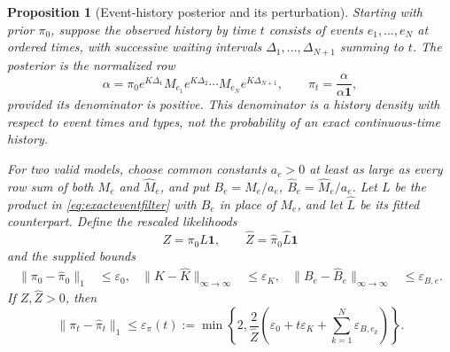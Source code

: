 \documentclass[11pt]{article}
\theoremstyle{plain}
\newtheorem{proposition}[theorem]{Proposition}
\theoremstyle{definition}
\theoremstyle{remark}
\newcommand{\norm}[1]{\lVert#1\rVert}
\begin{document}
\begin{proposition}[Event-history posterior and its perturbation]
\label{prop:eventfilter}
Starting with prior \(\pi_0\), suppose the observed history by time
\(t\) consists of events \(e_1,\ldots,e_N\) at ordered times, with
successive waiting intervals \(\Delta_1,\ldots,\Delta_{N+1}\) summing
to \(t\). The posterior is the normalized row
\begin{equation}\label{eq:exacteventfilter}
 \alpha=\pi_0e^{K\Delta_1}M_{e_1}e^{K\Delta_2}
                 \cdots M_{e_N}e^{K\Delta_{N+1}},\qquad
 \pi_t=\frac{\alpha}{\alpha\mathbf1},
\end{equation}
provided its denominator is positive. This denominator is a history
density with respect to event times and types, not the probability of
an exact continuous-time history.

For two valid models, choose common constants \(a_e>0\) at least as
large as every row sum of both \(M_e\) and \(\widehat M_e\), and put
\(B_e=M_e/a_e\), \(\widehat B_e=\widehat M_e/a_e\).
Let \(L\) be the product in \eqref{eq:exacteventfilter} with
\(B_e\) in place of \(M_e\), and let \(\widehat L\) be its fitted
counterpart. Define the rescaled likelihoods
\[
 Z=\pi_0L\mathbf1,\qquad
 \widehat Z=\widehat\pi_0\widehat L\mathbf1
\]
and the supplied bounds
\begin{align*}
 \norm{\pi_0-\widehat\pi_0}_1&\le\varepsilon_0,&
 \norm{K-\widehat K}_{\infty\to\infty}&\le\varepsilon_K,&
 \norm{B_e-\widehat B_e}_{\infty\to\infty}&\le\varepsilon_{B,e}.
\end{align*}
If \(Z,\widehat Z>0\), then
\begin{equation}\label{eq:filtererror}
 \norm{\pi_t-\widehat\pi_t}_1
 \le\varepsilon_\pi(t):=
 \min\left\{2,\frac{2}{\widehat Z}
       \left(\varepsilon_0+t\varepsilon_K+
             \sum_{k=1}^N\varepsilon_{B,e_k}\right)\right\}.
\end{equation}
\end{proposition}
\end{document}
